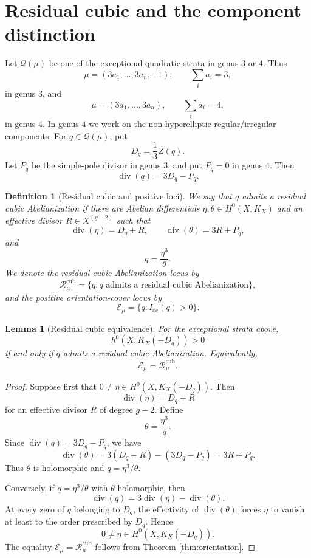 \documentclass[11pt]{article}
\newtheorem{lemma}[theorem]{Lemma}
\newtheorem{definition}[theorem]{Definition}
\theoremstyle{remark}
\newcommand{\Q}{\mathcal Q}
\newcommand{\Ioc}{I_{\mathrm{oc}}}
\newcommand{\Rcub}{\mathcal R^{\mathrm{cub}}}
\newcommand{\EE}{\mathcal E}
\DeclareMathOperator{\dv}{div}
\begin{document}
\section{Residual cubic and the component distinction}
Let $\Q(\mu)$ be one of the exceptional quadratic strata in genus $3$ or $4$. Thus
\[
\mu=(3a_1,\ldots,3a_n,-1),\qquad \sum_i a_i=3,
\]
in genus $3$, and
\[
\mu=(3a_1,\ldots,3a_n),\qquad \sum_i a_i=4,
\]
in genus $4$. In genus $4$ we work on the non-hyperelliptic regular/irregular components. For
$q\in\Q(\mu)$, put
\[
D_q=\frac13 Z(q).
\]
Let $P_q$ be the simple-pole divisor in genus $3$, and put $P_q=0$ in genus $4$. Then
\[
\dv(q)=3D_q-P_q.
\]
\begin{definition}[Residual cubic and positive loci]\label{def:residual}
We say that $q$ admits a residual cubic Abelianization
if there are Abelian differentials $\eta,\theta\in H^0(X,K_X)$ and an effective divisor $R\in X^{(g-2)}$
such that
\[
\dv(\eta)=D_q+R,\qquad \dv(\theta)=3R+P_q,
\]
and
\[
q=\frac{\eta^3}{\theta}.
\]
We denote the residual cubic Abelianization locus by
\[
\Rcub_\mu=\{q:q\text{ admits a residual cubic Abelianization}\},
\]
and the positive orientation-cover locus by
\[
\EE_\mu=\{q:\Ioc(q)>0\}.
\]
\end{definition}

\begin{lemma}[Residual cubic equivalence]\label{lem:residual}
For the exceptional strata above,
\[
h^0(X,K_X(-D_q))>0
\]
if and only if $q$ admits a residual cubic Abelianization. Equivalently,
\[
\EE_\mu=\Rcub_\mu.
\]
\end{lemma}
\begin{proof}
Suppose first that $0\ne\eta\in H^0(X,K_X(-D_q))$. Then
\[
\dv(\eta)=D_q+R
\]
for an effective divisor $R$ of degree $g-2$. Define
\[
\theta=\frac{\eta^3}{q}.
\]
Since $\dv(q)=3D_q-P_q$, we have
\[
\dv(\theta)=3(D_q+R)-(3D_q-P_q)=3R+P_q.
\]
Thus $\theta$ is holomorphic and $q=\eta^3/\theta$.

Conversely, if $q=\eta^3/\theta$ with $\theta$ holomorphic, then
\[
\dv(q)=3\dv(\eta)-\dv(\theta).
\]
At every zero of $q$ belonging to $D_q$, the effectivity of $\dv(\theta)$ forces $\eta$ to vanish at least to the
order prescribed by $D_q$. Hence
\[
0\ne\eta\in H^0(X,K_X(-D_q)).
\]
The equality $\EE_\mu=\Rcub_\mu$ follows from Theorem \ref{thm:orientation}.
\end{proof}
\end{document}
